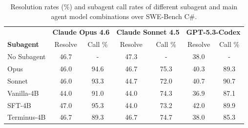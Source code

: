 \documentclass[sigconf,review]{acmart}
\newcommand{\impact}[2]{%
  \IfStrEq{#2}{red}{%
    \textcolor{BadRed}{\textbf{#1}}%
  }{%
    \IfStrEq{#2}{green}{%
      \textcolor{GoodGreen}{\textbf{#1}}%
    }{%
      \textbf{#1}%
    }%
  }%
}
\begin{document}

\begin{table}[t]
\centering
\caption{Resolution rates (\%) and subagent call rates of different subagent and main agent model combinations over SWE-Bench C\#.}
\label{swebcs_resolve}
\scriptsize
\begin{tabular}{lcccccc}
\toprule
& \multicolumn{2}{c}{\textbf{Claude Opus 4.6}} & \multicolumn{2}{c}{\textbf{Claude Sonnet 4.5}} & \multicolumn{2}{c}{\textbf{GPT-5.3-Codex}} \\
\textbf{Subagent} & \tiny Resolve & \tiny Call \% & \tiny Resolve & \tiny Call \% & \tiny Resolve & \tiny Call \% \\
\midrule
No Subagent   & 46.7 & - & 47.3 & - & 38.0 & - \\
Opus          & 46.0 & 94.6 & 46.7 & 75.3 & 40.3 & 89.3 \\
Sonnet        & 46.0 & 93.3 & 44.7 & 72.0 & 40.7 & 90.7 \\
Vanilla-4B    & 44.0 & 91.0 & 44.0 & 74.3 & 36.9 & 87.1 \\
SFT-4B        & 47.0 & 95.3 & 44.0 & 73.2 & 42.0 & 89.9 \\
Terminus-4B   & 46.7 & 89.3 & 46.7 & 74.7 & 38.0 & 85.3 \\
\bottomrule
\end{tabular}
\end{table}
\end{document}
